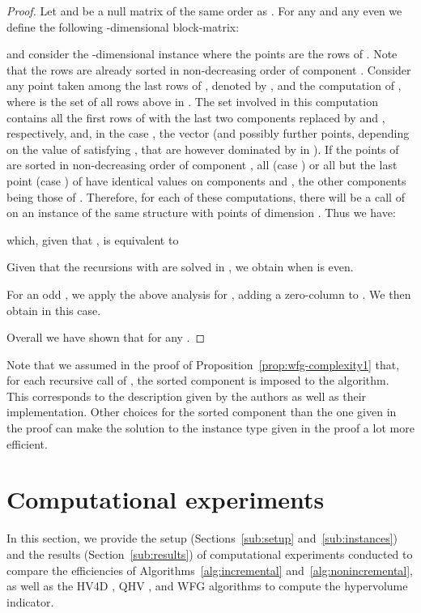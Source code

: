 \documentclass[a4paper,11pt]{article}
\begin{document}
\begin{proof}
Let 
and  be a null matrix of the same order as .
For any  and any even 
we define the following -dimensional
block-matrix:

and consider the -dimensional instance 
where the points are the  rows of .
Note that the rows are already sorted in non-decreasing order of component .
Consider any point  taken among the last  rows of ,
denoted by ,
and the computation of \WFG{},
where  is the set of all rows above  in .
The set  involved in this computation contains
all the first  rows of 
with the last two components replaced by  and , respectively,
and, in the case , the vector 
(and possibly further points, depending on the value of 
 satisfying , that are however dominated by 
 in ).
If the points of  are sorted in non-decreasing order of component ,
all (case ) or all but the last point (case ) of  
have identical values on components  and ,
the other components being those of .
Therefore, for each of these  computations,
there will be a call of {\WFG} on an instance of the same structure 
with  points of dimension .
Thus we have:

which, given that , is equivalent to

Given that the recursions with  are solved in ,
we obtain  when  is even.

For an odd , we apply the above analysis for ,
adding a zero-column to  . 
We then obtain  in this case.

Overall we have shown that 
for any .
\end{proof}



Note that we assumed in the proof of Proposition~\ref{prop:wfg-complexity1}
that, for each recursive call of {\WFG}, 
the sorted component is imposed to the algorithm.
This corresponds to the description given by the authors as well as their implementation.
Other choices for the sorted component than the one given in the proof
can make the solution 
to the instance type given in the proof a lot more efficient.


\section{Computational experiments}\label{sec:expe}

In this section, we provide the setup (Sections~\ref{sub:setup} and~\ref{sub:instances}) 
and the results (Section~\ref{sub:results}) of computational experiments
conducted to compare the efficiencies of Algorithms~\ref{alg:incremental} and~\ref{alg:nonincremental},
as well as the HV4D \citep{GueFonEmm12}, QHV \citep{RusFra14}, and WFG \citep{WhiBraBar12} algorithms
to compute the hypervolume indicator.
\end{document}
